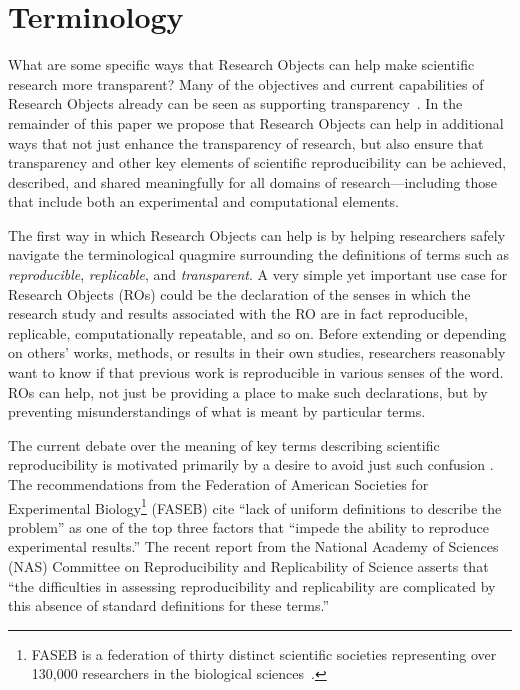 \section{Terminology}\label{sec-terminology}

What are some specific ways that Research Objects \cite{bechhofer2013whya} can help
	make scientific research more transparent?
Many of the objectives and current capabilities of Research Objects already can be seen as supporting
	transparency~\cite{mecum2018preservingc,DBLP:conf/eScience/2018}.
In the remainder of this paper we propose that Research Objects can help in additional ways that not
	just enhance the transparency of research, but also ensure that transparency and other key elements
	of scientific reproducibility can be achieved, described, and shared meaningfully for all domains
	of research---including those that include both an experimental and computational elements.

The first way in which Research Objects can help is by helping researchers safely navigate the
	terminological quagmire surrounding the definitions of terms such as \emph{reproducible},
	\emph{replicable}, and \emph{transparent}.
A very simple yet important use case for Research Objects (ROs) could be the declaration of the senses in
	which the research study and results associated with the RO are in fact reproducible, replicable,
	computationally repeatable, and so on.
Before extending or depending on others' works, methods, or results in their own studies, researchers
	reasonably want to know if that previous work is reproducible in various senses of the word.
ROs can help, not just be providing a place to make such declarations, but by preventing
	misunderstandings of what is meant by particular terms.

The current debate over the meaning of key terms describing
	scientific reproducibility is motivated primarily by a desire to avoid just such confusion \cite{drummond2009replicability,goodman2016what,rauber16primad,herouxtoward,plesser2018reproducibility,barba2018terminologies,committeeonreproducibilityandreplicabilityinscience2019reproducibility}.
The recommendations from the Federation of
	American Societies for Experimental Biology\footnote{FASEB is a federation of thirty distinct
    scientific societies representing over 130,000 researchers in the biological sciences~\cite{faseb_home}.}
	(FASEB)
	\cite{FASEB2016enhancing} cite ``lack of uniform definitions to describe the problem''
	as one of the top three factors that ``impede the ability to reproduce experimental results.''
 The recent report from the National Academy of Sciences (NAS) Committee on Reproducibility and Replicability of Science \cite{committeeonreproducibilityandreplicabilityinscience2019reproducibility} asserts
	that ``the difficulties in assessing reproducibility and replicability are complicated by this absence of
	standard definitions for these terms.''

